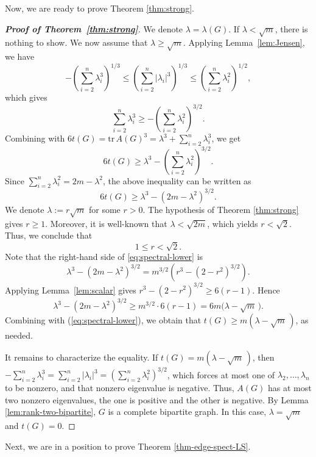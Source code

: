 \documentclass[10pt,a4paper]{amsart}
\renewcommand{\le}{\leqslant}
\renewcommand{\geq}{\geqslant}
\renewcommand{\ge}{\geqslant}
\begin{document}
Now, we are ready to prove Theorem \ref{thm:strong}. 

\begin{proof}[{\bf Proof of Theorem~\ref{thm:strong}}] 
We denote $ \lambda=\lambda(G)$.  
If $\lambda < \sqrt m$, there is nothing to show. We now assume that $\lambda \geq \sqrt m$. 
Applying Lemma~\ref{lem:Jensen}, we have 
\[ -\left( \sum_{i=2}^n\lambda_i^3 \right)^{1/3} \le \left( \sum_{i=2}^n |\lambda_i|^3 \right)^{1/3} \le \left( \sum_{i=2}^n\lambda_i^2 \right)^{1/2}, \]
which gives 
\[
    \sum_{i=2}^n\lambda_i^3
    \geq
    -\left(\sum_{i=2}^n\lambda_i^2\right)^{3/2}.
\]
Combining with $ 6t(G)= \mathrm{tr}\,A(G)^3 = \lambda^3+\sum_{i=2}^n\lambda_i^3$, 
we get 
\[
    6t(G)
    \geq
    \lambda^3-
    \left(\sum_{i=2}^n\lambda_i^2\right)^{3/2}.
\]
Since $  \sum_{i=2}^n\lambda_i^2=2m-\lambda^2$, the above inequality can be written as  
\begin{equation}\label{eq:spectral-lower}
    6t(G)
    \geq
    \lambda^3-(2m-\lambda^2)^{3/2}.
\end{equation}
We denote $ \lambda:= r{\sqrt m}$ for some $r >0$.  
The hypothesis of Theorem \ref{thm:strong} gives $r\ge 1$. Moreover, it is well-known that $\lambda <\sqrt{2m}$, which yields $r< \sqrt{2}$. Thus, 
we conclude that $$ 1\le r< \sqrt{2}. $$ 
Note that the right-hand side of \eqref{eq:spectral-lower} 
is 
\[
    \lambda^3-(2m-\lambda^2)^{3/2}
    =m^{3/2}\left(r^3-(2-r^2)^{3/2}\right).
\]
Applying Lemma~\ref{lem:scalar} gives 
$ r^3-(2-r^2)^{3/2}\geq 6(r-1)$.  
Hence
\begin{equation*} 
      \lambda^3-(2m-\lambda^2)^{3/2}
    \geq
    m^{3/2} \cdot 6(r-1) = 6m \big(\lambda - \sqrt{m}\, \big).
\end{equation*}
Combining with (\ref{eq:spectral-lower}), we obtain that 
$ t(G)\geq m(\lambda-\sqrt m\,)$, as needed. 

It remains to characterize the equality. If $t(G)=m(\lambda-\sqrt m\,)$, then
 $-\sum_{i=2}^n\lambda_i^3 = \sum_{i=2}^n |\lambda_i|^3=(\sum_{i=2}^n\lambda_i^2)^{3/2}$, which forces at most one of $\lambda_2,\dots,\lambda_n$ to be nonzero, and that nonzero eigenvalue is negative. 
Thus, $A(G)$ has at most two nonzero eigenvalues, the one is positive and the other is negative. By Lemma \ref{lem:rank-two-bipartite}, $G$ is a complete bipartite
graph. In this case, $\lambda=\sqrt m$ and $t(G)=0$. 
\end{proof}

Next, we are in a position to prove Theorem \ref{thm-edge-spect-LS}. 
\end{document}
